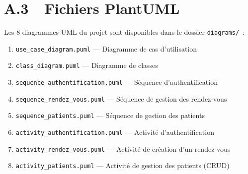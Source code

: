 \section*{A.3~~Fichiers PlantUML}

Les 8 diagrammes UML du projet sont disponibles dans le dossier \texttt{diagrams/}~:

\begin{enumerate}
    \item \texttt{use\_case\_diagram.puml} --- Diagramme de cas d'utilisation
    \item \texttt{class\_diagram.puml} --- Diagramme de classes
    \item \texttt{sequence\_authentification.puml} --- Séquence d'authentification
    \item \texttt{sequence\_rendez\_vous.puml} --- Séquence de gestion des rendez-vous
    \item \texttt{sequence\_patients.puml} --- Séquence de gestion des patients
    \item \texttt{activity\_authentification.puml} --- Activité d'authentification
    \item \texttt{activity\_rendez\_vous.puml} --- Activité de création d'un rendez-vous
    \item \texttt{activity\_patients.puml} --- Activité de gestion des patients (CRUD)
\end{enumerate}

\clearpage
